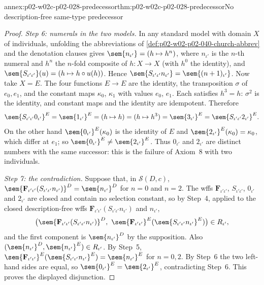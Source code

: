 \begin{annexitem}{annex:p02-w02c-p02-028-predecessor}{thm:p02-w02c-p02-028-predecessor}{No description-free same-type predecessor}
\begin{proof}
\emph{Step 6: numerals in the two models.}  In any standard model with
domain \(X\) of individuals, unfolding the abbreviations of
\cref{def:p02-w02-p02-040-church-abbrev} and the denotation clauses gives
\(\sem{n_{\iota'}}=(h\mapsto h^n)\), where \(n_{\iota'}\) is the \(n\)-th
numeral and \(h^n\) the \(n\)-fold composite of \(h:X\to X\) (with \(h^0\)
the identity), and
\(\sem{S_{\iota'\iota'}}(u)=(h\mapsto h\circ u(h))\).  Hence
\(\sem{S_{\iota'\iota'}n_{\iota'}}=\sem{(n+1)_{\iota'}}\).  Now take
\(X=E\).  The four functions \(E\to E\) are the identity, the
transposition \(\sigma\) of \(e_0,e_1\), and the constant maps \(\kappa_0\),
\(\kappa_1\) with values \(e_0\), \(e_1\).  Each satisfies \(h^3=h\):
\(\sigma^2\) is the identity, and constant maps and the identity are
idempotent.  Therefore
\[
 \sem{S_{\iota'\iota'}0_{\iota'}}^E=\sem{1_{\iota'}}^E=(h\mapsto h)
 =(h\mapsto h^3)=\sem{3_{\iota'}}^E=\sem{S_{\iota'\iota'}2_{\iota'}}^E.
\]
On the other hand \(\sem{0_{\iota'}}^E(\kappa_0)\) is the identity of \(E\)
and \(\sem{2_{\iota'}}^E(\kappa_0)=\kappa_0\), which differ at \(e_1\); so
\(\sem{0_{\iota'}}^E\ne\sem{2_{\iota'}}^E\).  Thus \(0_{\iota'}\) and
\(2_{\iota'}\) are distinct numbers with the same successor: this is the
failure of Axiom~8 with two individuals.

\emph{Step 7: the contradiction.}  Suppose that, in \(\mathcal S(D,c)\),
\(\sem{\mathbf F_{\iota'\iota'}(S_{\iota'\iota'}n_{\iota'})}^D=\sem{n_{\iota'}}^D\)
for \(n=0\) and \(n=2\).  The wffs \(\mathbf F_{\iota'\iota'}\),
\(S_{\iota'\iota'}\), \(0_{\iota'}\) and \(2_{\iota'}\) are closed and contain
no selection constant, so by Step~4, applied to the closed
description-free wffs \(\mathbf F_{\iota'\iota'}(S_{\iota'\iota'}n_{\iota'})\)
and \(n_{\iota'}\),
\[
 \bigl(\sem{\mathbf F_{\iota'\iota'}(S_{\iota'\iota'}n_{\iota'})}^D,\
 \sem{\mathbf F_{\iota'\iota'}}^E(\sem{S_{\iota'\iota'}n_{\iota'}}^E)\bigr)\in R_{\iota'},
\]
and the first component is \(\sem{n_{\iota'}}^D\) by the supposition.
Also \((\sem{n_{\iota'}}^D,\sem{n_{\iota'}}^E)\in R_{\iota'}\).  By
Step~5,
\(\sem{\mathbf F_{\iota'\iota'}}^E(\sem{S_{\iota'\iota'}n_{\iota'}}^E)=\sem{n_{\iota'}}^E\)
for \(n=0,2\).  By Step~6 the two left-hand sides are equal, so
\(\sem{0_{\iota'}}^E=\sem{2_{\iota'}}^E\), contradicting Step~6.  This proves
the displayed disjunction.


\end{proof}
\end{annexitem}
